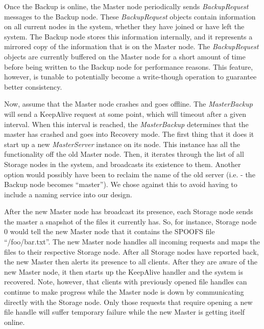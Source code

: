 Once the Backup is online, the Master node periodically sends \textit{BackupRequest} messages to the Backup node.  These \textit{BackupRequest} objects contain information on all current nodes in the system, whether they have joined or have left the system.  The Backup node stores this information internally, and it represents a mirrored copy of the information that is on the Master node.  The \textit{BackupRequest} objects are currently buffered on the Master node for a short amount of time before being written to the Backup node for performance reasons.  This feature, however, is tunable to potentially become a write-though operation to guarantee better consistency.

Now, assume that the Master node crashes and goes offline.  The \textit{MasterBackup} will send a KeepAlive request at some point, which will timeout after a given interval.  When this interval is reached, the \textit{MasterBackup} determines that the master has crashed and goes into Recovery mode.  The first thing that it does it start up a new \textit{MasterServer} instance on its node.  This instance has all the functionality off the old Master node.  Then, it iterates through the list of all Storage nodes in the system, and broadcasts its existence to them.  Another option would possibly have been to reclaim the name of the old server (i.e. - the Backup node becomes ``master'').  We chose against this to avoid having to include a naming service into our design.

After the new Master node has broadcast its presence, each Storage node sends the master a snapshot of the files it currently has.  So, for instance, Storage node 0 would tell the new Master node that it contains the SPOOFS file ``/foo/bar.txt''.  The new Master node handles all incoming requests and maps the files to their respective Storage node.  After all Storage nodes have reported back, the new Master then alerts its presence to all clients.  After they are aware of the new Master node, it then starts up the KeepAlive handler and the system is recovered.  Note, however, that clients with previously opened file handles can continue to make progress while the Master node is down by communicating directly with the Storage node.  Only those requests that require opening a new file handle will suffer temporary failure while the new Master is getting itself online.